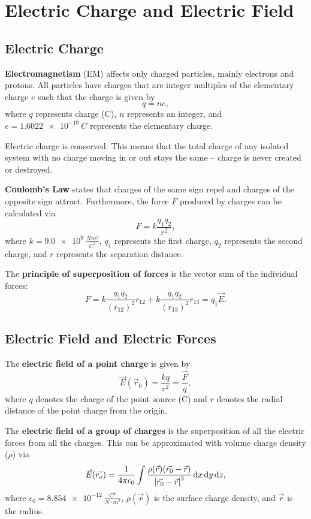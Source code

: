 
\chapter{Electric Charge and Electric Field}

\section{Electric Charge}
\textbf{Electromagnetism} (EM) affects only charged particles, mainly electrons and protons. All particles have charges that are integer multiples of the elementary charge $e$ such that the charge is given by
\begin{equation}
q = ne,
\end{equation}
where $q$ represents charge (C), $n$ represents an integer, and $e = \SI{1.6022e-19}{C}$ represents the elementary charge.

Electric charge is conserved. This means that the total charge of any isolated system with no charge moving in or out stays the same -- charge is never created or destroyed. 

\textbf{Coulomb's Law} states that charges of the same sign repel and charges of the opposite sign attract. Furthermore, the force $F$ produced by charges can be calculated via
\begin{equation}
F = k\frac{q_1q_2}{r^2},
\end{equation}
where $k = \SI{9.0e9}{\frac{N m^2}{C^2}}$, $q_1$ represents the first charge, $q_2$ represents the second charge, and $r$ represents the separation distance.

The \textbf{principle of superposition of forces} is the vector sum of the individual forces:
\begin{equation}
F = k\frac{q_1q_2}{(r_{12})^2}r_{12} + k\frac{q_1q_2}{(r_{13})^2}r_{13} = q_1 \vec{E}.
\end{equation}

\section{Electric Field and Electric Forces}
The \textbf{electric field of a point charge} is given by
\begin{equation}
\vec E (\vec r_0)= \frac{kq}{r^2} = \frac{\vec{F}}{q},
\end{equation}
where $q$ denotes the charge of the point source (C) and $r$ denotes the radial distance of the point charge from the origin.

The \textbf{electric field of a group of charges} is the superposition of all the electric forces from all the charges. This can be approximated with volume charge density ($\rho$) via
\begin{equation}
\vec{E}(\vec{r_o}) = \frac{1}{4\pi \epsilon_0} \int\frac{\rho(\vec{r}) (\vec{r_0} - \vec{r})}{\left| \vec{r_0} - \vec{r} \right|^3} \operatorname{d\!} x \operatorname{d\!} y \operatorname{d\!} z,
\end{equation}
where $\epsilon_0 = \SI{8.854e-12}{\frac{C^2}{N \cdot m^2}}$, $\rho(\vec{r})$ is the surface charge density, and $\vec{r}$ is the radius.

